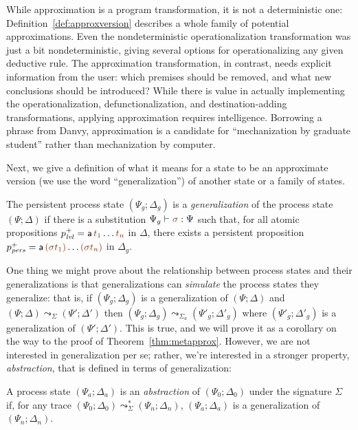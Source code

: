 \noindent
While approximation is a program transformation, it is not a
deterministic one: Definition~\ref{def:approxversion} describes a
whole family of potential approximations. Even the nondeterministic
operationalization transformation was just a bit nondeterministic,
giving several options for operationalizing any given deductive
rule. The approximation transformation, in contrast, needs explicit
information from the user: which premises should be removed, and what
new conclusions should be introduced? While there is value in actually
implementing the operationalization, defunctionalization, and
destination-adding transformations, applying approximation requires
intelligence. Borrowing a phrase from Danvy, approximation is a
candidate for ``mechanization by graduate student'' rather than
mechanization by computer.

Next, we give a definition of what it means for a state to be an 
approximate version (we use the word ``generalization'') of another state
or a family of states. 

\bigskip
\begin{definition}
  The persistent process state $(\Psi_g; \Delta_g)$ is a {\em
    generalization} of the process state $(\Psi; \Delta)$ if there is
  a substitution $\Psi_g \vdash \lf{\sigma} : \Psi$ such that, for all
  atomic propositions $p^+_\mlvl = {\sf a}\,\lf{t_1}\ldots \lf{t_n}$
  in $\Delta$, there exists a persistent proposition
  $p^+_\mpers = {\sf a}\,\lf{(\sigma t_1)}\ldots\lf{(\sigma t_n)}$ in
  $\Delta_g$.
\end{definition}
\bigskip

One thing we might prove about the relationship between process states
and their generalizations is that generalizations can {\it simulate}
the process states they generalize: that is, if $(\Psi_g; \Delta_g)$
is a generalization of $(\Psi; \Delta)$ and $(\Psi; \Delta)
\leadsto_\Sigma (\Psi'; \Delta')$ then $(\Psi_g; \Delta_g)
\leadsto_{\Sigma_a} (\Psi'_g; \Delta'_g)$ where $(\Psi'_g; \Delta'_g)$
is a generalization of $(\Psi'; \Delta')$. This is true, and we will
prove it as a corollary on the way to the proof of
Theorem~\ref{thm:metapprox}.  However, we are not interested in
generalization per se; rather, we're interested in a stronger
property, {\em abstraction}, that is defined in terms of
generalization:

\bigskip
\begin{definition}
A process state $(\Psi_a; \Delta_a)$ is an {\em abstraction} of 
$(\Psi_0; \Delta_0)$ under the signature $\Sigma$ if, for any trace
$(\Psi_0; \Delta_0) \leadsto^*_\Sigma (\Psi_n; \Delta_n)$, 
$(\Psi_a; \Delta_a)$ is a generalization of $(\Psi_n; \Delta_n)$. 
\end{definition}
\bigskip

